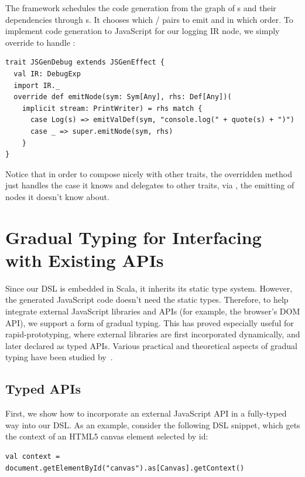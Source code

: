 \documentclass[runningheads,a4paper]{llncs}
\begin{document}
The framework schedules the code generation from the graph of
s and their dependencies through s. It chooses
which / pairs to emit and in which order. To
implement code generation to JavaScript for our logging IR node, we
simply override  to handle :
\begin{lstlisting}
trait JSGenDebug extends JSGenEffect {
  val IR: DebugExp
  import IR._
  override def emitNode(sym: Sym[Any], rhs: Def[Any])(
    implicit stream: PrintWriter) = rhs match {
      case Log(s) => emitValDef(sym, "console.log(" + quote(s) + ")")
      case _ => super.emitNode(sym, rhs)
    }
}
\end{lstlisting}
Notice that in order to compose nicely with other traits, the
overridden method just handles the case it knows and delegates to
other traits, via , the emitting of nodes it doesn't know
about.


\section{Gradual Typing for Interfacing with Existing APIs}\label{sec:typing}
Since our DSL is embedded in Scala, it inherits its static type
system. However, the generated JavaScript code doesn't need the static
types. Therefore, to help integrate external JavaScript libraries and
APIs (for example, the browser's DOM API), we support a form of
gradual typing. This has proved especially useful for
rapid-prototyping, where external libraries are first incorporated
dynamically, and later declared as typed APIs. Various practical and
theoretical aspects of gradual typing have been studied
by~\cite{wadler-blame,blame-for-all,abadi91,siek06,siek07}.

\subsection{Typed APIs}\label{sec:typedApis}
First, we show how to incorporate an external JavaScript API in a
fully-typed way into our DSL. As an example, consider the following
DSL snippet, which gets the context of an HTML5 canvas element
selected by id:
\begin{lstlisting}
val context = document.getElementById("canvas").as[Canvas].getContext()
\end{lstlisting}
\end{document}

